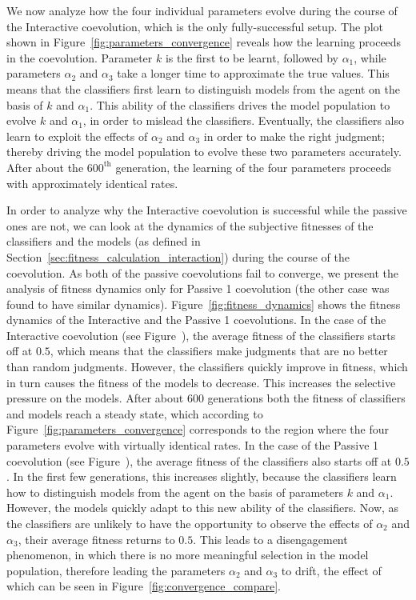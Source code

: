 We now analyze how the four individual parameters evolve during the course of the Interactive coevolution, which is the only fully-successful setup. The plot shown in Figure~\ref{fig:parameters_convergence} reveals how the learning proceeds in the coevolution. Parameter $k$ is the first to be learnt, followed by $\alpha_1$, while parameters $\alpha_2$ and $\alpha_3$ take a longer time to approximate the true values. This means that the classifiers first learn to distinguish models from the agent on the basis of $k$ and $\alpha_1$. This ability of the classifiers drives the model population to evolve $k$ and $\alpha_1$, in order to mislead the classifiers. Eventually, the classifiers also learn to exploit the effects of $\alpha_2$ and $\alpha_3$ in order to make the right judgment; thereby driving the model population to evolve these two parameters accurately. After about the $600^\textrm{th}$ generation, the learning of the four parameters proceeds with approximately identical rates.

In order to analyze why the Interactive coevolution is successful while the passive ones are not, we can look at the dynamics of the subjective fitnesses of the classifiers and the models (as defined in Section~\ref{sec:fitness_calculation_interaction}) during the course of the coevolution. As both of the passive coevolutions fail to converge, we present the analysis of fitness dynamics only for Passive 1 coevolution (the other case was found to have similar dynamics). Figure~\ref{fig:fitness_dynamics} shows the fitness dynamics of the Interactive and the Passive 1 coevolutions. In the case of the Interactive coevolution (see Figure~), the average fitness of the classifiers starts off at $0.5$, which means that the classifiers make judgments that are no better than random judgments. However, the classifiers quickly improve in fitness, which in turn causes the fitness of the models to decrease. This increases the selective pressure on the models. After about $600$ generations both the fitness of classifiers and models reach a steady state, which according to Figure~\ref{fig:parameters_convergence} corresponds to the region where the four parameters evolve with virtually identical rates. In the case of the Passive 1 coevolution (see Figure~), the average fitness of the classifiers also starts off at $0.5$. In the first few generations, this increases slightly, because the classifiers learn how to distinguish models from the agent on the basis of parameters $k$ and $\alpha_1$. However, the models quickly adapt to this new ability of the classifiers. Now, as the classifiers are unlikely to have the opportunity to observe the effects of $\alpha_2$ and $\alpha_3$, their average fitness returns to $0.5$. This leads to a disengagement phenomenon, in which there is no more meaningful selection in the model population, therefore leading the parameters $\alpha_2$ and $\alpha_3$ to drift, the effect of which can be seen in Figure~\ref{fig:convergence_compare}.

